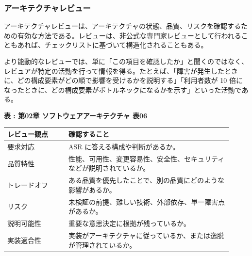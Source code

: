 \subsubsection{アーキテクチャレビュー}
アーキテクチャレビューは、アーキテクチャの状態、品質、リスクを確認するための有効な方法である。レビューは、非公式な専門家レビューとして行われることもあれば、チェックリストに基づいて構造化されることもある。

より能動的なレビューでは、単に「この項目を確認したか」と聞くのではなく、レビュアが特定の活動を行って情報を得る。たとえば、「障害が発生したときに、どの構成要素がどの順で影響を受けるかを説明する」「利用者数が 10 倍になったときに、どの構成要素がボトルネックになるかを示す」といった活動である。

\par\smallskip\noindent{}\label{tab:ch02-06}\textbf{表 \thetable: 第02章 ソフトウェアアーキテクチャ 表06}\par\smallskip
\begin{longtable}{P{0.25\linewidth}P{0.67\linewidth}}
\toprule
レビュー観点 & 確認すること \\
\midrule
要求対応 & ASR に答える構成や判断があるか。 \\
品質特性 & 性能、可用性、変更容易性、安全性、セキュリティなどが説明されているか。 \\
トレードオフ & ある品質を優先したことで、別の品質にどのような影響があるか。 \\
リスク & 未検証の前提、難しい技術、外部依存、単一障害点があるか。 \\
説明可能性 & 重要な意思決定に根拠が残っているか。 \\
実装適合性 & 実装がアーキテクチャに従っているか、または逸脱が管理されているか。 \\
\bottomrule
\end{longtable}
